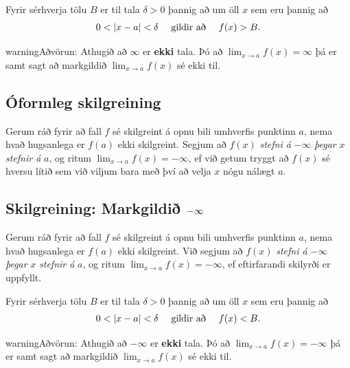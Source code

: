 \documentclass[a4paper,10pt,icelandic]{sphinxmanual}
\begin{document}
Fyrir sérhverja tölu \(B\) er til tala \(\delta>0\) þannig
að um öll \(x\) sem eru þannig að
\begin{gather}
\begin{split}0 < |x-a| <\delta \quad  \text{ gildir að } \quad f(x) > B.\end{split}\notag
\end{gather}
\begin{notice}{warning}{Aðvörun:}
Athugið að \(\infty\) er \textbf{ekki} tala. Þó að
\(\lim_{x\rightarrow a} f(x)=\infty\) þá er samt sagt að markgildið
\(\lim_{x\rightarrow a} f(x)\) sé ekki til.
\end{notice}


\subsection{Óformleg skilgreining}
\label{kafli02:id9}
Gerum ráð fyrir að fall \(f\) sé skilgreint á opnu bili umhverfis
punktinn \(a\), nema hvað hugsanlega er \(f(a)\) ekki
skilgreint. Segjum að \(f(x)\) \emph{stefni á} \(-\infty\) \emph{þegar}
\(x\) \emph{stefnir á} \(a\), og ritum
\(\lim_{x\rightarrow a} f(x)=-\infty\), ef við getum tryggt að
\(f(x)\) sé hversu lítið sem við viljum bara með því að velja
\(x\) nógu nálægt \(a\).


\subsection{Skilgreining: Markgildið \protect\(-\infty\protect\)}
\label{kafli02:id10}
Gerum ráð fyrir að fall \(f\) sé skilgreint á opnu bili umhverfis
punktinn \(a\), nema hvað hugsanlega er \(f(a)\) ekki
skilgreint. Við segjum að \(f(x)\) \emph{stefni á} \(-\infty\)
\emph{þegar} \(x\) \emph{stefnir á} \(a\), og ritum
\(\lim_{x\rightarrow a} f(x)=-\infty\), ef eftirfarandi skilyrði er
uppfyllt.

Fyrir sérhverja tölu \(B\) er til tala \(\delta>0\) þannig
að um öll \(x\) sem eru þannig að
\begin{gather}
\begin{split}0 < |x-a| < \delta \quad \text{ gildir að } \quad f(x)<B.\end{split}\notag
\end{gather}
\begin{notice}{warning}{Aðvörun:}
Athugið að \(-\infty\) er \textbf{ekki} tala. Þó að
\(\lim_{x\rightarrow a} f(x)=-\infty\) þá er samt sagt að markgildið
\(\lim_{x\rightarrow a} f(x)\) sé ekki til.
\end{notice}
\end{document}
